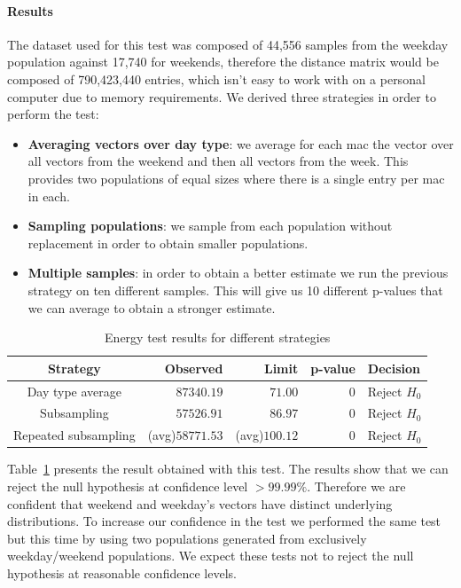 \paragraph{Results}
The dataset used for this test was composed of 44,556 samples from the weekday population against 17,740 for weekends, therefore the distance matrix would be composed of 790,423,440 entries, which isn't easy to work with on a personal computer due to memory requirements. We derived three strategies in order to perform the test:
\begin{itemize}
	\item \textbf{Averaging vectors over day type}: we average for each \acrshort{mac} the vector over all vectors from the weekend and then all vectors from the week. This provides two populations of equal sizes where there is a single entry per \acrshort{mac} in each.
	\item \textbf{Sampling populations}: we sample from each population without replacement in order to obtain smaller populations. 
	\item \textbf{Multiple samples}: in order to obtain a better estimate we run the previous strategy on ten different samples. This will give us 10 different p-values that we can average to obtain a stronger estimate.
\end{itemize}

\begin{table}[h]
\begin{center}
\begin{tabular}{c r r r l}
\hline
\textbf{Strategy} & \textbf{Observed} & \textbf{Limit} & \textbf{p-value} & \textbf{Decision}\\ 
\hline\hline
Day type average &  $87340.19$ & $71.00$ & $0$ & Reject $H_0$\\
\hline
Subsampling &  $57526.91$ & $86.97$ & $0$ &  Reject $H_0$\\
\hline
Repeated subsampling &  (avg)$58771.53$  & (avg)$100.12$ & $0$ &  Reject $H_0$\\
\end{tabular}
\end{center}
\caption{\label{hyp_test_res}Energy test results for different strategies}
\end{table}

Table~\ref{hyp_test_res} presents the result obtained with this test. The results show that we can reject the null hypothesis at confidence level $>99.99\%$. Therefore we are confident that weekend and weekday's vectors have distinct underlying distributions. To increase our confidence in the test we performed the same test but this time by using two populations generated from exclusively weekday/weekend populations. We expect these tests not to reject the null hypothesis at reasonable confidence levels. 

